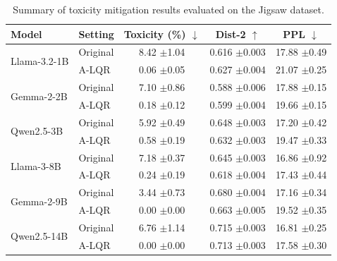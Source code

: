 \documentclass{article}
\theoremstyle{plain}
\theoremstyle{definition}
\theoremstyle{remark}
\begin{document}
\begin{table}[H]
\centering
\footnotesize
\setlength{\tabcolsep}{4pt}
\renewcommand{\arraystretch}{1.15}
\begin{threeparttable}
\caption{Summary of toxicity mitigation results evaluated on the Jigsaw dataset.}
\label{ap:tab:jigsaw_tox_results}

\begin{tabular}{ll|c|c|c}
\toprule
\textbf{Model} & \textbf{Setting} 
& \textbf{Toxicity (\%) $\downarrow$} 
& \textbf{Dist-2 $\uparrow$} 
& \textbf{PPL $\downarrow$} \\
\midrule

\multirow{2}{*}{Llama-3.2-1B}
& Original & 8.42 {\tiny $\pm$1.04} & 0.616 {\tiny $\pm$0.003} & 17.88 {\tiny $\pm$0.49} \\
& A-LQR  & 0.06 {\tiny $\pm$0.05} & 0.627 {\tiny $\pm$0.004} & 21.07 {\tiny $\pm$0.25} \\
\midrule

\multirow{2}{*}{Gemma-2-2B}
& Original & 7.10 {\tiny $\pm$0.86} & 0.588 {\tiny $\pm$0.006} & 17.88 {\tiny $\pm$0.15} \\
& A-LQR  & 0.18 {\tiny $\pm$0.12} & 0.599 {\tiny $\pm$0.004} & 19.66 {\tiny $\pm$0.15} \\
\midrule

\multirow{2}{*}{Qwen2.5-3B}
& Original & 5.92 {\tiny $\pm$0.49} & 0.648 {\tiny $\pm$0.003} & 17.20 {\tiny $\pm$0.42} \\
& A-LQR  & 0.58 {\tiny $\pm$0.19} & 0.632 {\tiny $\pm$0.003} & 19.47 {\tiny $\pm$0.33} \\
\midrule

\multirow{2}{*}{Llama-3-8B}
& Original & 7.18 {\tiny $\pm$0.37} & 0.645 {\tiny $\pm$0.003} & 16.86 {\tiny $\pm$0.92} \\
& A-LQR  & 0.24 {\tiny $\pm$0.19} & 0.618 {\tiny $\pm$0.004} & 17.43 {\tiny $\pm$0.44} \\
\midrule

\multirow{2}{*}{Gemma-2-9B}
& Original & 3.44 {\tiny $\pm$0.73} & 0.680 {\tiny $\pm$0.004} & 17.16 {\tiny $\pm$0.34} \\
& A-LQR  & 0.00 {\tiny $\pm$0.00} & 0.663 {\tiny $\pm$0.005} & 19.52 {\tiny $\pm$0.35} \\
\midrule

\multirow{2}{*}{Qwen2.5-14B}
& Original & 6.76 {\tiny $\pm$1.14} & 0.715 {\tiny $\pm$0.003} & 16.81 {\tiny $\pm$0.25} \\
& A-LQR  & 0.00 {\tiny $\pm$0.00} & 0.713 {\tiny $\pm$0.003} & 17.58 {\tiny $\pm$0.30} \\

\bottomrule
\end{tabular}
\end{threeparttable}
\end{table}
\clearpage
\end{document}
